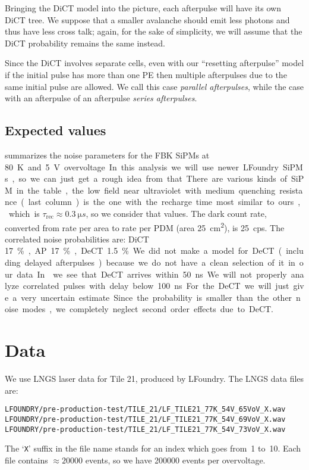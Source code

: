 Bringing the DiCT model into the picture, each afterpulse will have its own
DiCT tree. We suppose that a smaller avalanche should emit less photons and
thus have less cross talk; again, for the sake of simplicity, we will assume
that the DiCT probability remains the same instead.

Since the DiCT involves separate cells, even with our ``resetting afterpulse''
model if the initial pulse has more than one PE then multiple afterpulses due
to the same initial pulse are allowed. We call this case \emph{parallel
afterpulses}, while the case with an afterpulse of an afterpulse \emph{series
afterpulses}.

\subsection{Expected values}
\label{sec:expval}

\cite[tab.~3.1~p.~62]{savarese2018} summarizes the noise parameters for the FBK
SiPMs at \SI{80}K and \SI{5}V overvoltage. In this analysis we will use newer
LFoundry SiPMs, so we can just get a rough idea from that. There are various
kinds of SiPM in the table, the low field near ultraviolet with medium
quenching resistance (last column) is the one with the recharge time most
similar to ours, which is $\tau_\text{rec} \approx \SI{0.3}{\micro s}$, so we
consider that values. The dark count rate, converted from rate per area to rate
per PDM (area \SI{25}{cm^2}), is \SI{25}{cps}. The correlated noise
probabilities are: DiCT \SI{17}\%, AP \SI{17}\%, DeCT \SI{1.5}\%.

We did not make a model for DeCT (including delayed afterpulses) because we do
not have a clean selection of it in our data. In
\cite[fig.~3.8~p.~54]{savarese2018} we see that DeCT arrives within
\SI{50}{ns}. We will not properly analyze correlated pulses with delay below
\SI{100}{ns}. For the DeCT we will just give a very uncertain estimate. Since
the probability is smaller than the other noise modes, we completely neglect
second order effects due to DeCT.

\section{Data}

We use LNGS laser data for Tile 21, produced by LFoundry. The LNGS data files
are:
%
\begin{verbatim}
LFOUNDRY/pre-production-test/TILE_21/LF_TILE21_77K_54V_65VoV_X.wav
LFOUNDRY/pre-production-test/TILE_21/LF_TILE21_77K_54V_69VoV_X.wav
LFOUNDRY/pre-production-test/TILE_21/LF_TILE21_77K_54V_73VoV_X.wav
\end{verbatim}
%
The `\texttt{X}' suffix in the file name stands for an index which goes from~1
to~10. Each file contains $\approx\num{20000}$ events, so we have \num{200000}
events per overvoltage.

